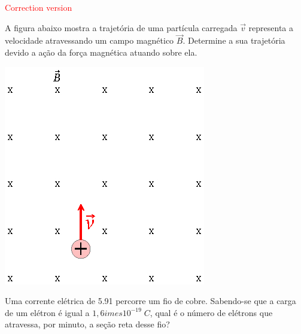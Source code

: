 \documentclass[12pt, addpoints]{exam}
\begin{document}
        \begin{center}
\textcolor{red}{\emph\Large Correction version}\end{center}
\begin{questions}
\begin{multicols*}{2}
\question[20] A ﬁgura abaixo mostra a trajetória de uma partícula carregada $\vec{v}$ representa a velocidade atravessando um campo magnético $\vec{B}$. Determine a sua trajetória devido a ação da força magnética atuando sobre ela.

\begin{center}
\begin{minipage}[c]{0.75\linewidth}
\includegraphics[width=\textwidth]{CEMAG001.jpg}
\end{minipage}

\end{center}
\begin{oneparchoices}
\end{oneparchoices}
\question[20] Uma corrente elétrica de    5.91 percorre um ﬁo de cobre. Sabendo-se que a carga de um elétron é igual a $1,6	imes 10^{-19}\;C$, qual é o número de elétrons que atravessa, por minuto, a seção reta desse ﬁo?

\begin{oneparchoices}
\end{oneparchoices}
\end{multicols*}
\end{questions}
\newpage
\end{document}
